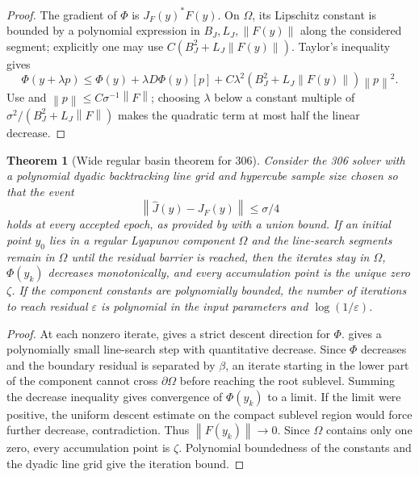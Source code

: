 \documentclass[11pt]{article}
\newtheorem{theorem}[definition]{Theorem}
\newcommand{\norm}[1]{\left\lVert #1\right\rVert}
\begin{document}
\begin{proof}
The gradient of $\Phi$ is $J_F(y)^*F(y)$.  On $\Omega$, its Lipschitz constant is bounded by a polynomial expression in $B_J,L_J,\norm{F(y)}$ along the considered segment; explicitly one may use $C(B_J^2+L_J\norm{F(y)})$.  Taylor's inequality gives
\[
        \Phi(y+\lambda p)
        \le \Phi(y)+\lambda D\Phi(y)[p]
        + C\lambda^2(B_J^2+L_J\norm{F(y)})\norm p^2.
\]
Use  and $\norm p\le C\sigma^{-1}\norm F$; choosing $\lambda$ below a constant multiple of $\sigma^2/(B_J^2+L_J\norm F)$ makes the quadratic term at most half the linear decrease.
\end{proof}

\begin{theorem}[Wide regular basin theorem for 306]\label{thm:wide-basin}
Consider the 306 solver with a polynomial dyadic backtracking line grid and hypercube sample size chosen so that the event
\[
        \norm{\widehat J(y)-J_F(y)}\le\sigma/4
\]
holds at every accepted epoch, as provided by  with a union bound.  If an initial point $y_0$ lies in a regular Lyapunov component $\Omega$ and the line-search segments remain in $\Omega$ until the residual barrier is reached, then the iterates stay in $\Omega$, $\Phi(y_k)$ decreases monotonically, and every accumulation point is the unique zero $\zeta$.  If the component constants are polynomially bounded, the number of iterations to reach residual $\varepsilon$ is polynomial in the input parameters and $\log(1/\varepsilon)$.
\end{theorem}

\begin{proof}
At each nonzero iterate,  gives a strict descent direction for $\Phi$.   gives a polynomially small line-search step with quantitative decrease.  Since $\Phi$ decreases and the boundary residual is separated by $\beta$, an iterate starting in the lower part of the component cannot cross $\partial\Omega$ before reaching the root sublevel.  Summing the decrease inequality gives convergence of $\Phi(y_k)$ to a limit.  If the limit were positive, the uniform descent estimate on the compact sublevel region would force further decrease, contradiction.  Thus $\norm{F(y_k)}\to0$.  Since $\Omega$ contains only one zero, every accumulation point is $\zeta$.  Polynomial boundedness of the constants and the dyadic line grid give the iteration bound.
\end{proof}
\end{document}

